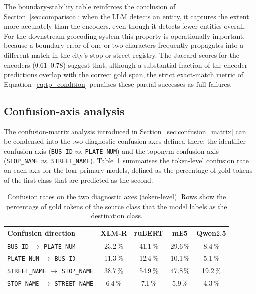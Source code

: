 The boundary-stability table reinforces the conclusion of Section~\ref{sec:comparison}: when the LLM detects an entity, it captures the extent more accurately than the encoders, even though it detects fewer entities overall. For the downstream geocoding system this property is operationally important, because a boundary error of one or two characters frequently propagates into a different match in the city's stop or street registry. The Jaccard scores for the encoders ($0.61$--$0.78$) suggest that, although a substantial fraction of the encoder predictions overlap with the correct gold span, the strict exact-match metric of Equation~\eqref{eq:tp_condition} penalises these partial successes as full failures.

\subsection{Confusion-axis analysis}
\label{sec:confusion_axes}

The confusion-matrix analysis introduced in Section~\ref{sec:confusion_matrix} can be condensed into the two diagnostic confusion axes defined there: the identifier confusion axis (\texttt{BUS\_ID} \textit{vs.} \texttt{PLATE\_NUM}) and the toponym confusion axis (\texttt{STOP\_NAME} \textit{vs.} \texttt{STREET\_NAME}). Table~\ref{tab:confusion_axes} summarises the token-level confusion rate on each axis for the four primary models, defined as the percentage of gold tokens of the first class that are predicted as the second.

\begin{table}[H]
\centering
\caption{Confusion rates on the two diagnostic axes (token-level). Rows show the percentage of gold tokens of the source class that the model labels as the destination class.}
\label{tab:confusion_axes}
\renewcommand{\arraystretch}{1.3}
\begin{tabular}{lcccc}
\toprule
\textbf{Confusion direction} & \textbf{XLM-R} & \textbf{ruBERT} & \textbf{mE5} & \textbf{Qwen2.5} \\
\midrule
\texttt{BUS\_ID} $\rightarrow$ \texttt{PLATE\_NUM}   & 23.2\,\% & 41.1\,\% & 29.6\,\% &  8.4\,\% \\
\texttt{PLATE\_NUM} $\rightarrow$ \texttt{BUS\_ID}   & 11.3\,\% & 12.4\,\% & 10.1\,\% &  5.1\,\% \\
\texttt{STREET\_NAME} $\rightarrow$ \texttt{STOP\_NAME} & 38.7\,\% & 54.9\,\% & 47.8\,\% & 19.2\,\% \\
\texttt{STOP\_NAME} $\rightarrow$ \texttt{STREET\_NAME} &  6.4\,\% &  7.1\,\% &  5.9\,\% &  4.3\,\% \\
\bottomrule
\end{tabular}
\end{table}

